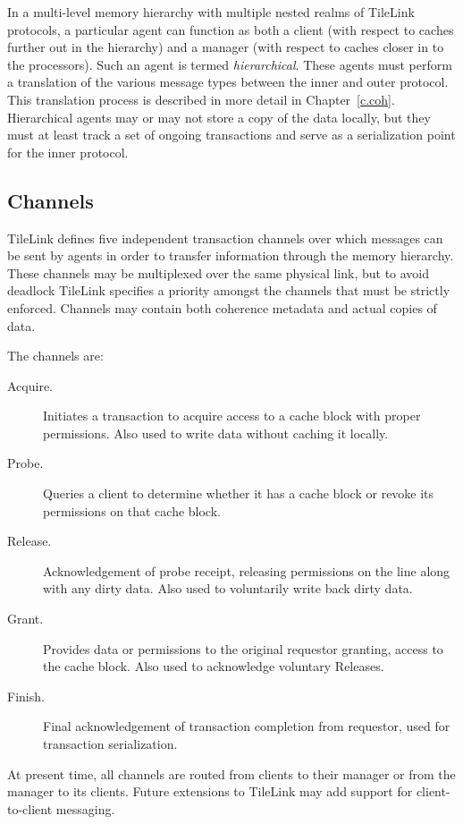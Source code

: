 In a multi-level memory hierarchy with multiple nested realms of TileLink protocols, a particular agent can function as both
a client (with respect to caches further out in the hierarchy)
and a manager (with respect to caches closer in to the processors).
Such an agent is termed {\em hierarchical}.
These agents must perform a translation of the various message types between the inner and outer protocol.
This translation process is described in more detail in Chapter~\ref{c.coh}.
Hierarchical agents may or may not store a copy of the data locally, but they must at least track a set of ongoing transactions and serve as a serialization point for the inner protocol.

\subsection{Channels}

TileLink defines five independent transaction channels over which messages can be sent by agents in order to transfer information through the memory hierarchy.
These channels may be multiplexed over the same physical link, but to avoid deadlock TileLink specifies a priority amongst the channels that must be strictly enforced.
Channels may contain both coherence metadata and actual copies of data.

The channels are:
\begin{description}
\item[Acquire.] Initiates a transaction to acquire access to a cache block with proper permissions. Also used to write data without caching it locally.
\item[Probe.] Queries a client to determine whether it has a cache block or revoke its permissions on that cache block.
\item[Release.] Acknowledgement of probe receipt, releasing permissions on the line along with any dirty data. Also used to voluntarily write back dirty data.
\item[Grant.] Provides data or permissions to the original requestor granting, access to the cache block. Also used to acknowledge voluntary Releases.
\item[Finish.] Final acknowledgement of transaction completion from requestor, used for transaction serialization.
\end{description}

At present time, all channels are routed from clients to their manager or from the manager to its clients.
Future extensions to TileLink may add support for client-to-client messaging.

